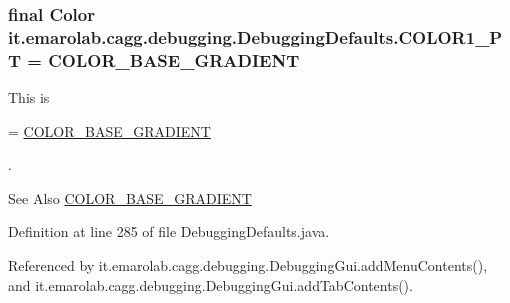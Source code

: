 \hypertarget{classit_1_1emarolab_1_1cagg_1_1debugging_1_1DebuggingDefaults_adbfdef4e2fb7f930f8842592472ea99c}{
\subsubsection[{C\-O\-L\-O\-R1\-\_\-\-P\-T}]{\setlength{\rightskip}{0pt plus 5cm}final Color it.\-emarolab.\-cagg.\-debugging.\-Debugging\-Defaults.\-C\-O\-L\-O\-R1\-\_\-\-P\-T = {\bf C\-O\-L\-O\-R\-\_\-\-B\-A\-S\-E\-\_\-\-G\-R\-A\-D\-I\-E\-N\-T}\hspace{0.3cm}{\ttfamily [static]}}}\label{classit_1_1emarolab_1_1cagg_1_1debugging_1_1DebuggingDefaults_adbfdef4e2fb7f930f8842592472ea99c}
This is
\begin{DoxyCode}
= \hyperlink{classit_1_1emarolab_1_1cagg_1_1debugging_1_1DebuggingDefaults_a17491ab8ed655381e8f8cc34e9d3b670}{COLOR\_BASE\_GRADIENT} 
\end{DoxyCode}
 . \begin{DoxySeeAlso}{See Also}
\hyperlink{classit_1_1emarolab_1_1cagg_1_1debugging_1_1DebuggingDefaults_a17491ab8ed655381e8f8cc34e9d3b670}{C\-O\-L\-O\-R\-\_\-\-B\-A\-S\-E\-\_\-\-G\-R\-A\-D\-I\-E\-N\-T} 
\end{DoxySeeAlso}


Definition at line 285 of file Debugging\-Defaults.\-java.



Referenced by it.\-emarolab.\-cagg.\-debugging.\-Debugging\-Gui.\-add\-Menu\-Contents(), and it.\-emarolab.\-cagg.\-debugging.\-Debugging\-Gui.\-add\-Tab\-Contents().

